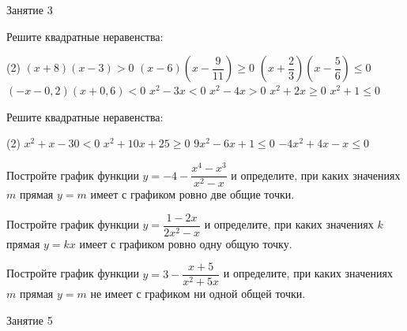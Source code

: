 \begin{class}[number=3]
	\begin{listofex}
		\item Занятие 3 
	\end{listofex}
\end{class}

\begin{class}[number=4]
	\begin{listofex}
		\item Решите квадратные неравенства:
		\begin{tasks}(2)
			\task \( (x+8)(x-3)>0 \)
			\task \( (x-6)(x-\dfrac{9}{11})\ge0 \)
			\task \( (x+\dfrac{2}{3})(x-\dfrac{5}{6})\le0 \)
			\task \( (-x-0,2)(x+0,6)<0 \)
			\task \( x^2-3x<0 \)
			\task \( x^2-4x>0 \)
			\task \( x^2+2x\ge0 \)
			\task \( x^2+1\le0 \)
		\end{tasks}
		\item Решите квадратные неравенства:
		\begin{tasks}(2)
			\task \( x^2+x-30<0 \)
			\task \( x^2+10x+25\ge0 \)
			\task \( 9x^2-6x+1\le0 \)
			\task \( -4x^2+4x-x\le0 \)
		\end{tasks}
		\item Постройте график функции \( y=-4-\dfrac{x^4-x^3}{x^2-x} \) и определите, при каких значениях \( m \) прямая \( y=m \) имеет с графиком ровно две общие точки.
	\end{listofex}
\end{class}

\begin{homework}[number=2]
	\begin{listofex}
			\item Постройте график функции \( y=\dfrac{1-2x}{2x^2-x} \) и определите, при каких значениях \( k \) прямая \( y=kx \) имеет с графиком ровно одну общую точку.
		\item Постройте график функции \( y=3-\dfrac{x+5}{x^2+5x} \) и определите, при каких значениях \( m \) прямая \( y=m \) не имеет с графиком ни одной общей точки.
	\end{listofex}
\end{homework}

\begin{class}[number=5]
	\begin{listofex}
		\item Занятие 5
		\end{listofex}
\end{class}

